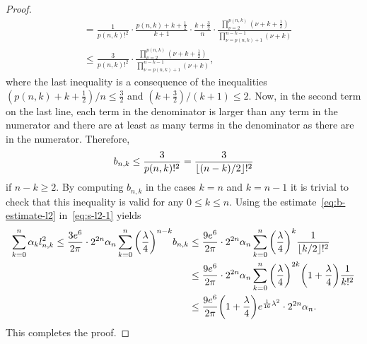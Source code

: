 \documentclass{mcom-l}
\numberwithin{equation}{section}
\numberwithin{theorem}{section} %
\DeclarePairedDelimiter{\floor}{\lfloor}{\rfloor}         %
\begin{document}
\begin{proof}
\begin{align*}
      &= \frac{1}{ p(n,k)!^2 } \cdot \frac{p(n,k) + k + \frac{1}{2}}{k + 1} \cdot \frac{k + \frac{3}{2}}{n} \cdot \frac{\prod_{\nu = 2}^{p(n,k)} (\nu + k + \frac{1}{2})}{\prod_{\nu=p(n,k)+1}^{n-k-1} (\nu + k)} \\
      &\leq \frac{3}{ p(n,k)!^2 } \cdot \frac{\prod_{\nu = 2}^{p(n,k)} (\nu + k + \frac{1}{2})}{\prod_{\nu=p(n,k)+1}^{n-k-1} (\nu + k)},
  \end{align*}
  where the last inequality is a consequence of the inequalities $(p(n,k) + k + \frac{1}{2})/n \leq \frac{3}{2}$ and $(k + \frac{3}{2}) / (k+1) \leq 2$.
  Now, in the second term on the last line, each term in the denominator is larger than any term in the numerator and there are at least as many terms in the denominator as there are in the numerator.
  Therefore,
  \begin{equation} \label{eq:b-estimate-l2}
    b_{n, k} \leq \frac{3}{ p(n,k)!^2 } = \frac{3}{\floor{(n-k)/2}!^2}
  \end{equation}
  if $n-k \geq 2$. By computing $b_{n,k}$ in the cases $k = n$ and $k = n - 1$ it is trivial to check that this inequality is valid for any $0 \leq k \leq n$.
  Using the estimate~\eqref{eq:b-estimate-l2} in~\eqref{eq:s-l2-1} yields
  \begin{equation*}
    \begin{split}
      \sum_{k=0}^n \alpha_k l_{n,k}^2 \leq \frac{3e^6}{2\pi} \cdot 2^{2n} \alpha_n \sum_{k=0}^n \bigg( \frac{\lambda}{4} \bigg)^{n-k} b_{n,k} &\leq \frac{9e^6}{2\pi} \cdot 2^{2n} \alpha_n \sum_{k=0}^n \bigg( \frac{\lambda}{4} \bigg)^{k} \frac{1}{\floor{k/2}!^2} \\
      &\leq \frac{9e^6}{2\pi} \cdot 2^{2n} \alpha_n \sum_{k=0}^n \bigg( \frac{\lambda}{4} \bigg)^{2k} \bigg(1 + \frac{\lambda}{4} \bigg) \frac{1}{k!^2} \\
      &\leq \frac{9e^6}{2\pi} \bigg(1 + \frac{\lambda}{4} \bigg) e^{\frac{1}{16} \lambda^2} \cdot 2^{2n} \alpha_n.
    \end{split}
  \end{equation*}
  This completes the proof.
\end{proof}
\end{document}

